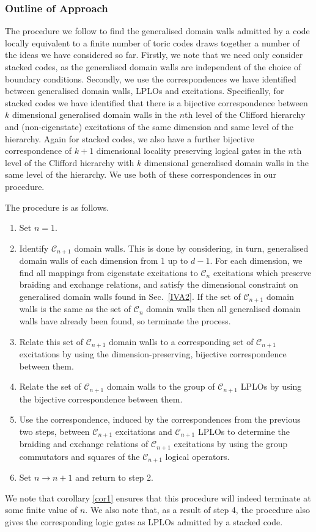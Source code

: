 \documentclass[pra,twocolumn,a4paper,nofootinbib]{revtex4-1}
\begin{document}
\subsubsection{Outline of Approach}
The procedure we follow to find the generalised domain walls admitted by a code locally equivalent to a finite number of toric codes draws together a number of the ideas we have considered so far. Firstly, we note that we need only consider stacked codes, as the generalised domain walls are independent of the choice of boundary conditions. Secondly, we use the correspondences we have identified between generalised domain walls, LPLOs and excitations. Specifically, for stacked codes we have identified that there is a bijective correspondence between $k$ dimensional generalised domain walls in the $n$th level of the Clifford hierarchy and (non-eigenstate) excitations of the same dimension and same level of the hierarchy. Again for stacked codes, we also have a further bijective correspondence of $k+1$ dimensional locality preserving logical gates in the $n$th level of the Clifford hierarchy with $k$ dimensional generalised domain walls in the same level of the hierarchy. We use both of these correspondences in our procedure.

The procedure is as follows.
\begin{enumerate}
\item Set $n=1$.
\item Identify $\mathcal{C}_{n+1}$ domain walls. This is done by considering, in turn, generalised domain walls of each dimension from 1 up to $d-1$. For each dimension, we find all mappings from eigenstate excitations to $\mathcal{C}_{n}$ excitations which preserve braiding and exchange relations, and satisfy the dimensional constraint on generalised domain walls found in Sec.~\ref{IVA2}. If the set of $\mathcal{C}_{n+1}$ domain walls is the same as the set of $\mathcal{C}_n$ domain walls then all generalised domain walls have already been found, so terminate the process. 
\item Relate this set of $\mathcal{C}_{n+1}$ domain walls to a corresponding set of $\mathcal{C}_{n+1}$ excitations by using the dimension-preserving, bijective correspondence between them.
\item Relate the set of $\mathcal{C}_{n+1}$ domain walls to the group of $\mathcal{C}_{n+1}$ LPLOs by using the bijective correspondence between them.
\item Use the correspondence, induced by the correspondences from the previous two steps, between $\mathcal{C}_{n+1}$ excitations and $\mathcal{C}_{n+1}$ LPLOs to determine the braiding and exchange relations of $\mathcal{C}_{n+1}$ excitations by using the group commutators and squares of the $\mathcal{C}_{n+1}$ logical operators.
\item Set $n\to n+1$ and return to step 2.
\end{enumerate}
We note that corollary \ref{cor1} ensures that this procedure will indeed terminate at some finite value of $n$.  We also note that, as a result of step 4, the procedure also gives the corresponding logic gates as LPLOs admitted by a stacked code.
\end{document}
